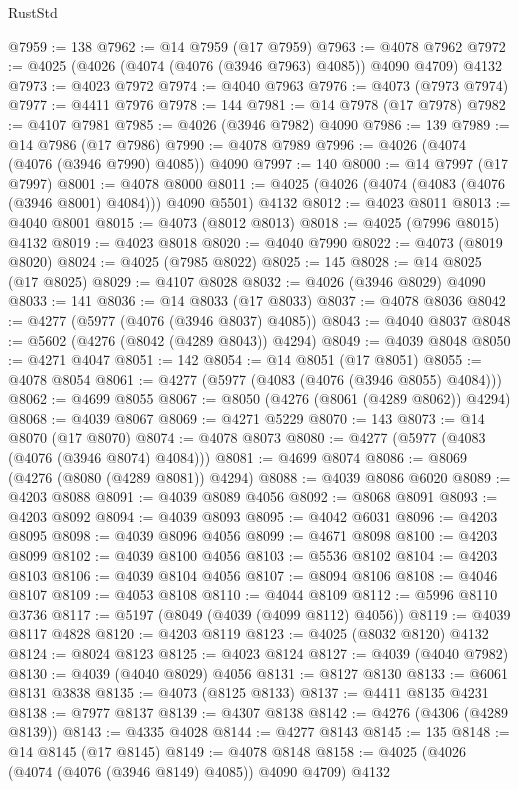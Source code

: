 \begin{lexlean}{RustStd}
\begin{coremodule}
@7959 := 138
@7962 := @14 @7959 (@17 @7959)
@7963 := @4078 @7962
@7972 := @4025 (@4026 (@4074 (@4076 (@3946 @7963) @4085)) @4090 @4709) @4132
@7973 := @4023 @7972
@7974 := @4040 @7963
@7976 := @4073 (@7973 @7974)
@7977 := @4411 @7976
@7978 := 144
@7981 := @14 @7978 (@17 @7978)
@7982 := @4107 @7981
@7985 := @4026 (@3946 @7982) @4090
@7986 := 139
@7989 := @14 @7986 (@17 @7986)
@7990 := @4078 @7989
@7996 := @4026 (@4074 (@4076 (@3946 @7990) @4085)) @4090
@7997 := 140
@8000 := @14 @7997 (@17 @7997)
@8001 := @4078 @8000
@8011 := @4025 (@4026 (@4074 (@4083 (@4076 (@3946 @8001) @4084))) @4090 @5501) @4132
@8012 := @4023 @8011
@8013 := @4040 @8001
@8015 := @4073 (@8012 @8013)
@8018 := @4025 (@7996 @8015) @4132
@8019 := @4023 @8018
@8020 := @4040 @7990
@8022 := @4073 (@8019 @8020)
@8024 := @4025 (@7985 @8022)
@8025 := 145
@8028 := @14 @8025 (@17 @8025)
@8029 := @4107 @8028
@8032 := @4026 (@3946 @8029) @4090
@8033 := 141
@8036 := @14 @8033 (@17 @8033)
@8037 := @4078 @8036
@8042 := @4277 (@5977 (@4076 (@3946 @8037) @4085))
@8043 := @4040 @8037
@8048 := @5602 (@4276 (@8042 (@4289 @8043)) @4294)
@8049 := @4039 @8048
@8050 := @4271 @4047
@8051 := 142
@8054 := @14 @8051 (@17 @8051)
@8055 := @4078 @8054
@8061 := @4277 (@5977 (@4083 (@4076 (@3946 @8055) @4084)))
@8062 := @4699 @8055
@8067 := @8050 (@4276 (@8061 (@4289 @8062)) @4294)
@8068 := @4039 @8067
@8069 := @4271 @5229
@8070 := 143
@8073 := @14 @8070 (@17 @8070)
@8074 := @4078 @8073
@8080 := @4277 (@5977 (@4083 (@4076 (@3946 @8074) @4084)))
@8081 := @4699 @8074
@8086 := @8069 (@4276 (@8080 (@4289 @8081)) @4294)
@8088 := @4039 @8086 @6020
@8089 := @4203 @8088
@8091 := @4039 @8089 @4056
@8092 := @8068 @8091
@8093 := @4203 @8092
@8094 := @4039 @8093
@8095 := @4042 @6031
@8096 := @4203 @8095
@8098 := @4039 @8096 @4056
@8099 := @4671 @8098
@8100 := @4203 @8099
@8102 := @4039 @8100 @4056
@8103 := @5536 @8102
@8104 := @4203 @8103
@8106 := @4039 @8104 @4056
@8107 := @8094 @8106
@8108 := @4046 @8107
@8109 := @4053 @8108
@8110 := @4044 @8109
@8112 := @5996 @8110 @3736
@8117 := @5197 (@8049 (@4039 (@4099 @8112) @4056))
@8119 := @4039 @8117 @4828
@8120 := @4203 @8119
@8123 := @4025 (@8032 @8120) @4132
@8124 := @8024 @8123
@8125 := @4023 @8124
@8127 := @4039 (@4040 @7982)
@8130 := @4039 (@4040 @8029) @4056
@8131 := @8127 @8130
@8133 := @6061 @8131 @3838
@8135 := @4073 (@8125 @8133)
@8137 := @4411 @8135 @4231
@8138 := @7977 @8137
@8139 := @4307 @8138
@8142 := @4276 (@4306 (@4289 @8139))
@8143 := @4335 @4028
@8144 := @4277 @8143
@8145 := 135
@8148 := @14 @8145 (@17 @8145)
@8149 := @4078 @8148
@8158 := @4025 (@4026 (@4074 (@4076 (@3946 @8149) @4085)) @4090 @4709) @4132

\end{coremodule}
\end{lexlean}
